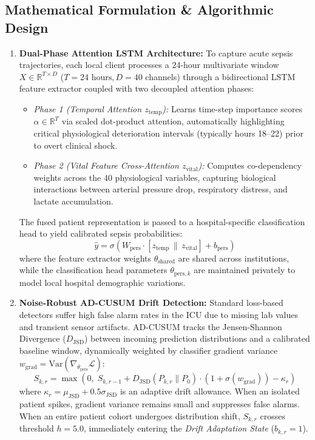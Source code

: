 \documentclass[11pt, a4paper]{article}
\begin{document}
\subsection{Mathematical Formulation \& Algorithmic Design}
\begin{enumerate}[leftmargin=*, noitemsep, topsep=2pt]
    \item \textbf{Dual-Phase Attention LSTM Architecture:} To capture acute sepsis trajectories, each local client processes a 24-hour multivariate window $X \in \mathbb{R}^{T \times D}$ ($T=24\text{ hours}, D=40$ channels) through a bidirectional LSTM feature extractor coupled with two decoupled attention phases:
    \begin{itemize}[noitemsep, topsep=1pt]
        \item \textit{Phase 1 (Temporal Attention $z_{\text{temp}}$):} Learns time-step importance scores $\alpha \in \mathbb{R}^T$ via scaled dot-product attention, automatically highlighting critical physiological deterioration intervals (typically hours 18--22) prior to overt clinical shock.
        \item \textit{Phase 2 (Vital Feature Cross-Attention $z_{\text{vital}}$):} Computes co-dependency weights across the 40 physiological variables, capturing biological interactions between arterial pressure drop, respiratory distress, and lactate accumulation.
    \end{itemize}
    The fused patient representation is passed to a hospital-specific classification head to yield calibrated sepsis probabilities:
    \begin{equation}
        \hat{y} = \sigma\left(W_{\text{pers}} \cdot [z_{\text{temp}} \,\|\, z_{\text{vital}}] + b_{\text{pers}}\right)
    \end{equation}
    where the feature extractor weights $\theta_{\text{shared}}$ are shared across institutions, while the classification head parameters $\theta_{\text{pers}, k}$ are maintained privately to model local hospital demographic variations.

    \item \textbf{Noise-Robust AD-CUSUM Drift Detection:} Standard loss-based detectors suffer high false alarm rates in the ICU due to missing lab values and transient sensor artifacts. AD-CUSUM tracks the Jensen-Shannon Divergence ($D_{\mathrm{JSD}}$) between incoming prediction distributions and a calibrated baseline window, dynamically weighted by classifier gradient variance $w_{\mathrm{grad}} = \mathrm{Var}(\nabla_{\theta_{\text{pers}}} \mathcal{L})$:
    \begin{equation}
        S_{k, r} = \max\left(0, \; S_{k, r-1} + D_{\mathrm{JSD}}(P_{k, r} \parallel P_0) \cdot \left(1 + \sigma(w_{\mathrm{grad}})\right) - \kappa_r\right)
    \end{equation}
    where $\kappa_r = \mu_{\mathrm{JSD}} + 0.5\sigma_{\mathrm{JSD}}$ is an adaptive drift allowance. When an isolated patient spikes, gradient variance remains small and suppresses false alarms. When an entire patient cohort undergoes distribution shift, $S_{k, r}$ crosses threshold $h = 5.0$, immediately entering the \textit{Drift Adaptation State} ($b_{k, r} = 1$).


\end{enumerate}
\end{document}
